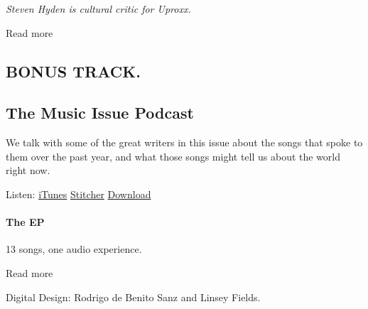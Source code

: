\emph{Steven Hyden is cultural critic for Uproxx.}

Read more

\hypertarget{bonus-track-1}{%
\subsection{BONUS TRACK.}\label{bonus-track-1}}

\hypertarget{--the-music-issue-podcast}{%
\subsection{\texorpdfstring{ The Music Issue
Podcast}{  The Music Issue Podcast}}\label{--the-music-issue-podcast}}

We talk with some of the great writers in this issue about the songs
that spoke to them over the past year, and what those songs might tell
us about the world right now.

Listen:
\href{https://itunes.apple.com/us/podcast/the-ep-13-songs-that-capture-our-moment/id1213030309?mt=2\&ign-mpt=uo\%3D4}{iTunes}
\textbar{}
\href{http://www.stitcher.com/podcast/the-new-york-times/the-ep-13-songs-that-capture-our-moment?refid=stpr}{Stitcher}
\textbar{}
\href{https://static01.graylady3jvrrxbe.onion/newsgraphics/2017/03/03/music2017/assets/audio/nytmag_ep_2017.mp3}{Download}

\hypertarget{the-ep}{%
\paragraph{The EP}\label{the-ep}}

13 songs, one audio experience.

Read more

Digital Design: Rodrigo de Benito Sanz and Linsey Fields.

\hypertarget{-10}{%
\subsection{}\label{-10}}


